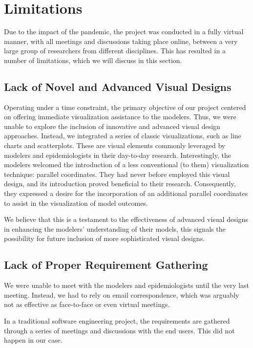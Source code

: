 \section{Limitations}

Due to the impact of the pandemic, the project was conducted in a fully virtual manner, with all meetings and discussions taking place online, between a very large group of researchers from different disciplines. This has resulted in a number of limitations, which we will discuss in this section.

\subsection{Lack of Novel and Advanced Visual Designs}
Operating under a time constraint, the primary objective of our project centered on offering immediate visualization assistance to the modelers.
Thus, we were unable to explore the inclusion of innovative and advanced visual design approaches.
Instead, we integrated a series of classic visualizations, such as line charts and scatterplots.
These are visual elements commonly leveraged by modelers and epidemiologists in their day-to-day research.
Interestingly, the modelers welcomed the introduction of a less conventional (to them) visualization technique: parallel coordinates.
They had never before employed this visual design, and its introduction proved beneficial to their research.
Consequently, they expressed a desire for the incorporation of an additional parallel coordinates to assist in the visualization of model outcomes.

We believe that this is a testament to the effectiveness of advanced visual designs in enhancing the modelers' understanding of their models, this signals the possibility for future inclusion of more sophisticated visual designs.

\subsection{Lack of Proper Requirement Gathering}
We were unable to meet with the modelers and epidemiologists until the very last meeting. Instead, we had to rely on email correspondence, which was arguably not as effective as face-to-face or even virtual meetings.

In a traditional software engineering project, the requirements are gathered through a series of meetings and discussions with the end users. This did not happen in our case.

